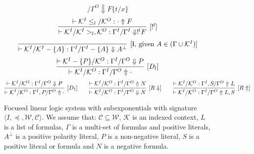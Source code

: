 \documentclass[a4paper, 11pt]{article}
\begin{document}
\begin{figure}[t]
$${/ \Gamma^O \Downarrow F\{t/x\}}
$$
\vspace{-2.5mm}
$$
\infer[\text{[$!^l$]}]{\vdash \mathcal{K}^I / \mathcal{K}^I >_l, \mathcal{K}^O :
\Gamma^I / \Gamma^I \Downarrow !^l F}{\vdash \mathcal{K}^I \leq_l /
\mathcal{K}^O : \cdot \Uparrow F}
$$
\vspace{-2.5mm}
$$
\infer[\text{[I, given $A \in (\Gamma \cup
\mathcal{K}^I)$]}]{\vdash \mathcal{K}^I / \mathcal{K}^I - \{A\} : \Gamma^I /
\Gamma^I - \{A\} \Downarrow A^\bot}{}
$$
\vspace{-2.5mm}
$$
\infer[\text{[$D_l$]}]{\vdash
\mathcal{K}^I / \mathcal{K}^O: \Gamma^I / \Gamma^O \Uparrow \cdot}{\vdash
\mathcal{K}^I - \{P\} / \mathcal{K}^O : \Gamma^I / \Gamma^O \Downarrow P}
$$
\vspace{-2.5mm}
$$
\infer[\text{[$D_1$]}]{\vdash \mathcal{K}^I / \mathcal{K}^O : \Gamma^I, P /
\Gamma^O \Uparrow \cdot}{\vdash \mathcal{K}^I / \mathcal{K}^O  : \Gamma^I /
\Gamma^O \Downarrow P}
\qquad
\infer[\text{[$R\Downarrow$]}]{\vdash \mathcal{K}^I / \mathcal{K}^O : \Gamma^I /
\Gamma^O \Downarrow N}{\vdash \mathcal{K}^I / \mathcal{K}^O : \Gamma^I /
\Gamma^O \Uparrow N}
\qquad
\infer[\text{[$R\Uparrow$]}]{\vdash \mathcal{K}^I / \mathcal{K}^O : \Gamma^I /
\Gamma^O \Uparrow L, S}{\vdash \mathcal{K}^I / \mathcal{K}^O : \Gamma^I, S /
\Gamma^O \Uparrow L}
$$
\caption{Focused linear logic system with subexponentials with signature
$\langle I, \preceq, \mathcal{W}, \mathcal{C} \rangle$. We assume that: $\mathcal{C} \subseteq
\mathcal{W}$, $\mathcal{K}$ is an indexed context, $L$ is a list of formulas, $\Gamma$ is a multi-set of
formulas and positive literals, $A^\bot$ is a positive polarity literal,
$P$ is a non-negative literal, $S$ is a positive literal or formula and $N$
is a negative formula.}
\label{figure:sellf}
\vspace{-5mm}
\end{figure}
\end{document}
